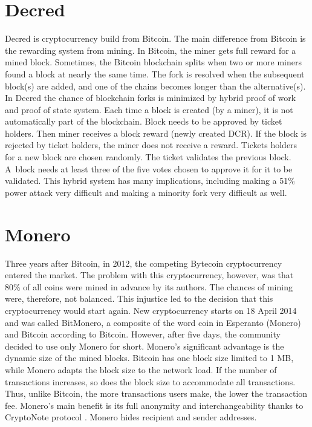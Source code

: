\section{Decred}
Decred is cryptocurrency build from Bitcoin. The main difference from Bitcoin is the rewarding system from mining. In Bitcoin, the miner gets full reward for a mined block. Sometimes, the Bitcoin blockchain splits when two or more miners found a block at nearly the same time. The fork is resolved when the subsequent block(s) are added, and one of the chains becomes longer than the alternative(s). In Decred the chance of blockchain forks is minimized by hybrid proof of work and proof of state system. Each time a block is created (by a miner), it is not automatically part of the blockchain. Block needs to be approved by ticket holders. Then miner receives a block reward (newly created DCR). If the block is rejected by ticket holders, the miner does not receive a reward. Tickets holders for a new block are chosen randomly. The ticket validates the previous block. A~block needs at least three of the five votes chosen to approve it for it to be validated.  This hybrid system has many implications, including making a 51\% power attack very difficult and making a minority fork very difficult as well. \cite{decredWhitePaper}

\section{Monero}
Three years after Bitcoin, in 2012, the competing Bytecoin cryptocurrency entered the market. The problem with this cryptocurrency, however, was that 80\% of all coins were mined in advance by its authors. The chances of mining were, therefore, not balanced. This injustice led to the decision that this cryptocurrency would start again. New cryptocurrency starts on 18 April 2014 and was called BitMonero, a composite of the word coin in Esperanto (Monero) and Bitcoin according to Bitcoin. However, after five days, the community decided to use only Monero for short. Monero's significant advantage is the dynamic size of the mined blocks. Bitcoin has one block size limited to 1 MB, while Monero adapts the block size to the network load. If the number of transactions increases, so does the block size to accommodate all transactions. Thus, unlike Bitcoin, the more transactions users make, the lower the transaction fee. Monero's main benefit is its full anonymity and interchangeability thanks to CryptoNote protocol \cite{van2013cryptonote}. Monero hides recipient and sender addresses. \cite{moneroTracebility}

